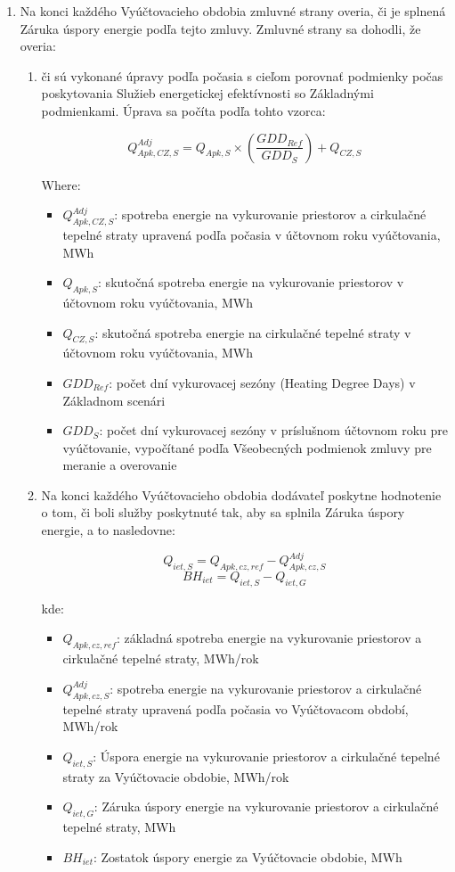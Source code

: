 \begin{enumerate}
	\item Na konci každého Vyúčtovacieho obdobia zmluvné strany overia, či je splnená Záruka úspory energie podľa tejto zmluvy. Zmluvné strany sa dohodli, že overia:
	\begin{enumerate}
		\item či sú vykonané úpravy podľa počasia s cieľom porovnať podmienky počas poskytovania Služieb energetickej efektívnosti so Základnými podmienkami. Úprava sa počíta podľa tohto vzorca:

\[ Q^{Adj}_{Apk,CZ,S} = Q_{Apk,S} \times \left( \frac{GDD_{Ref}}{GDD_S}\right) + Q_{CZ,S} \]

Where:

\begin{itemize}
	\item $Q^{Adj}_{Apk,CZ,S}$: spotreba energie na vykurovanie priestorov a cirkulačné tepelné straty upravená podľa počasia v účtovnom roku vyúčtovania, MWh
	\item $Q_{Apk,S}$: skutočná spotreba energie na vykurovanie priestorov v účtovnom roku vyúčtovania, MWh
	\item $Q_{CZ,S}$: skutočná spotreba energie na cirkulačné tepelné straty v účtovnom roku vyúčtovania, MWh
	\item $GDD_{Ref}$: počet dní vykurovacej sezóny (Heating Degree Days) v Základnom scenári 
	\item $GDD_S$: počet dní vykurovacej sezóny v príslušnom účtovnom roku pre vyúčtovanie, vypočítané podľa Všeobecných podmienok zmluvy pre meranie a overovanie
\end{itemize}

		\item Na konci každého Vyúčtovacieho obdobia dodávateľ poskytne hodnotenie o tom, či boli služby poskytnuté tak, aby sa splnila Záruka úspory energie, a to nasledovne:

\[ Q_{iet,S} = Q_{Apk,cz,ref} - Q^{Adj}_{Apk,cz,S} \]
\[ BH_{iet} = Q_{iet,S} - Q_{iet,G} \]

kde:

\begin{itemize}
\item $Q_{Apk,cz,ref}$: základná spotreba energie na vykurovanie priestorov a cirkulačné tepelné straty, MWh/rok
\item $Q^{Adj}_{Apk,cz,S}$: spotreba energie na vykurovanie priestorov a cirkulačné tepelné straty upravená podľa počasia vo Vyúčtovacom období, MWh/rok
\item $Q_{iet,S}$: Úspora energie na vykurovanie priestorov a cirkulačné tepelné straty za Vyúčtovacie obdobie, MWh/rok
\item $Q_{iet,G}$: Záruka úspory energie na vykurovanie priestorov a cirkulačné tepelné straty, MWh
\item $BH_{iet}$: Zostatok úspory energie za Vyúčtovacie obdobie, MWh
\end{itemize}


\end{enumerate}
\end{enumerate}
